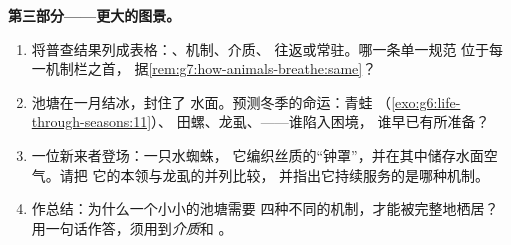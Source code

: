 \begin{problem}
\medskip\noindent\textbf{第三部分——更大的图景。}
\begin{enumerate}[resume]
  \item 将普查结果列成表格：、机制、介质、
        往返或常驻。哪一条单一规范
        位于每一机制栏之首，
        据\cref{rem:g7:how-animals-breathe:same}？
  \item 池塘在一月结冰，封住了
        水面。预测冬季的命运：青蛙
        （\cref{exo:g6:life-through-seasons:11}）、
        田螺、龙虱、——谁陷入困境，
        谁早已有所准备？
  \item 一位新来者登场：一只水蜘蛛，
        它编织丝质的“钟罩”，并在其中储存水面空气。请把
        它的本领与龙虱的并列比较，
        并指出它持续服务的是哪种机制。
  \item 作总结：为什么一个小小的池塘需要
        四种不同的机制，才能被完整地栖居？
        用一句话作答，须用到\emph{介质}和
        \emph{}。
\end{enumerate}
\end{problem}
